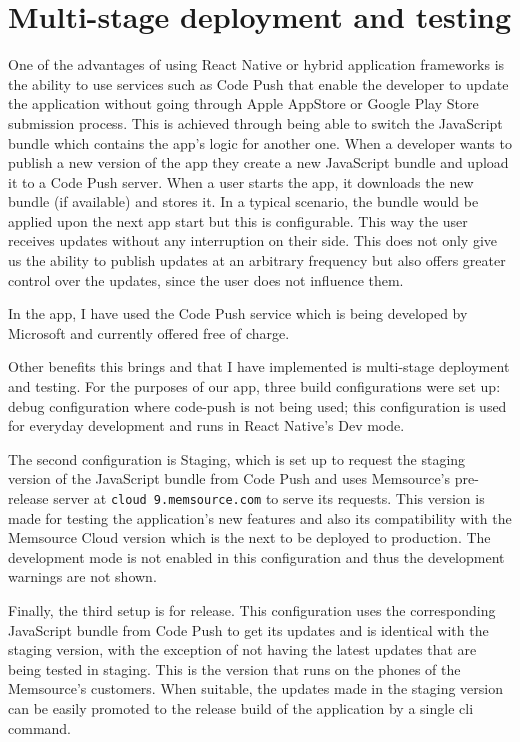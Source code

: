 \section{Multi-stage deployment and testing}


One of the advantages of using React Native or hybrid application frameworks is the ability to use services such as Code Push that enable the developer to update the application without going through Apple AppStore or Google Play Store submission process. This is achieved through being able to switch the JavaScript bundle which contains the app’s logic for another one. When a developer wants to publish a new version of the app they create a new JavaScript bundle and upload it to a Code Push server. 
When a user starts the app, it downloads the new bundle (if available) and stores it. In a typical scenario, the bundle would be applied upon the next app start but this is configurable. This way the user receives updates without any interruption on their side. This does not only give us the ability to publish updates at an arbitrary frequency but also offers greater control over the updates, since the user does not influence them.


In the app, I have used the Code Push service which is being developed by Microsoft and currently offered free of charge. 


Other benefits this brings and that I have implemented is multi-stage deployment and testing. For the purposes of our app, three build configurations were set up: debug configuration where code-push is not being used; this configuration is used for everyday development and runs in React Native’s Dev mode.

The second configuration is Staging, which is set up to request the staging version of the JavaScript bundle from Code Push and uses Memsource’s pre-release server at \texttt{cloud 9.memsource.com} to serve its requests. This version is made for testing the application's new features and also its compatibility with the Memsource Cloud version which is the next to be deployed to production. The development mode is not enabled in this configuration and thus the development warnings are not shown. 


Finally, the third setup is for release. This configuration uses the corresponding JavaScript bundle from Code Push to get its updates and is identical with the staging version, with the exception of not having the latest updates that are being tested in staging. This is the version that runs on the phones of the Memsource’s customers. When suitable, the updates made in the staging version can be easily promoted to the release build of the application by a single cli command.

